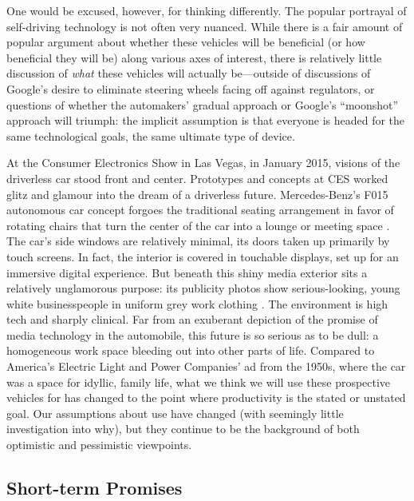 One would be excused, however, for thinking differently. The popular
portrayal of self-driving technology is not often very nuanced. While
there is a fair amount of popular argument about whether these
vehicles will be beneficial (or how beneficial they will be) along
various axes of interest, there is relatively little discussion of
\emph{what} these vehicles will actually be---outside of discussions of
Google's desire to eliminate steering wheels facing off against
regulators, or questions of whether the automakers' gradual approach
or Google's ``moonshot'' approach will triumph: the implicit
assumption is that everyone is headed for the same technological
goals, the same ultimate type of device.

At the Consumer Electronics Show in Las Vegas, in January
2015, visions of the driverless car stood front and center. Prototypes
and concepts at CES worked glitz and glamour into the dream of a
driverless future. Mercedes-Benz's F015 autonomous car
concept forgoes the traditional seating arrangement in favor of
rotating chairs that turn the center of the car into a lounge or
meeting space \cite{riofrioMB}. The car's side windows are relatively minimal, its
doors taken up primarily by touch screens. In fact, the interior is
covered in touchable displays, set up for an immersive digital
experience. But beneath this shiny media exterior sits a relatively
unglamorous purpose:  its publicity photos show serious-looking, young white
businesspeople in uniform grey work clothing \cite{simpsonDesign}. The environment is
high tech and sharply clinical. Far from an exuberant depiction of the
promise of media technology in the automobile, this future is so
serious as to be dull: a homogeneous work space bleeding out into
other parts of life. Compared to America's Electric Light and Power
Companies' ad from the 1950s, where the car was a space for idyllic,
family life, what we think we will use these prospective vehicles for
has changed to the point where productivity is the stated or unstated
goal. Our assumptions about use have changed (with seemingly little
investigation into why), but they continue to be the background of both
optimistic and pessimistic viewpoints.

\subsection{Short-term Promises}

